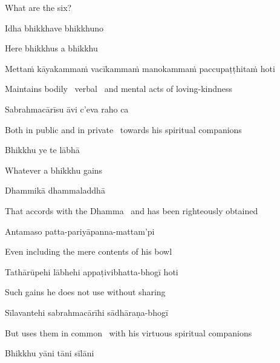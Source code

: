 \begin{english}
  What are the six?
\end{english}

Idha bhikkhave bhikkhuno

\begin{english}
  Here bhikkhus a bhikkhu
\end{english}

\begin{pali-hang}
  Mettaṁ kāyakammaṁ vacīkammaṁ manokammaṁ paccupaṭṭhitaṁ hoti
\end{pali-hang}

\begin{english-hang}
  Maintains bodily \breathmark\ verbal \breathmark\ and mental acts of loving-kindness
\end{english-hang}

Sabrahmacārīsu āvi c'eva raho ca

\begin{english}
  Both in public and in private \breathmark\ towards his spiritual companions
\end{english}

Bhikkhu ye te lābhā

\begin{english}
  Whatever a bhikkhu gains
\end{english}

Dhammikā dhammaladdhā

\begin{english}
  That accords with the Dhamma \breathmark\ and has been righteously obtained
\end{english}

Antamaso patta-pariyāpanna-mattam'pi

\begin{english}
  Even including the mere contents of his bowl
\end{english}

Tathārūpehi lābhehi appaṭivibhatta-bhogī hoti

\begin{english}
  Such gains he does not use without sharing
\end{english}

Sīlavantehi sabrahmacārīhi sādhāraṇa-bhogī

\begin{english}
  But uses them in common \breathmark\ with his virtuous spiritual companions
\end{english}

Bhikkhu yāni tāni sīlāni

